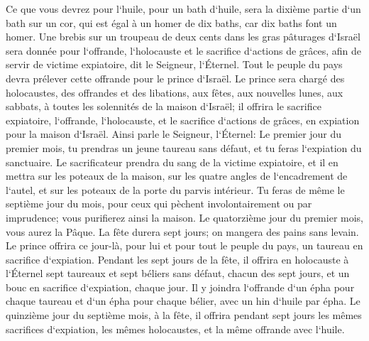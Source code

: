 \verse Ce que vous devrez pour l`huile, pour un bath d`huile, sera la dixième partie d`un bath sur un cor, qui est égal à un homer de dix baths, car dix baths font un homer. 
\verse Une brebis sur un troupeau de deux cents dans les gras pâturages d`Israël sera donnée pour l`offrande, l`holocauste et le sacrifice d`actions de grâces, afin de servir de victime expiatoire, dit le Seigneur, l`Éternel. 
\verse Tout le peuple du pays devra prélever cette offrande pour le prince d`Israël. 
\verse Le prince sera chargé des holocaustes, des offrandes et des libations, aux fêtes, aux nouvelles lunes, aux sabbats, à toutes les solennités de la maison d`Israël; il offrira le sacrifice expiatoire, l`offrande, l`holocauste, et le sacrifice d`actions de grâces, en expiation pour la maison d`Israël. 
\verse Ainsi parle le Seigneur, l`Éternel: Le premier jour du premier mois, tu prendras un jeune taureau sans défaut, et tu feras l`expiation du sanctuaire. 
\verse Le sacrificateur prendra du sang de la victime expiatoire, et il en mettra sur les poteaux de la maison, sur les quatre angles de l`encadrement de l`autel, et sur les poteaux de la porte du parvis intérieur. 
\verse Tu feras de même le septième jour du mois, pour ceux qui pèchent involontairement ou par imprudence; vous purifierez ainsi la maison. 
\verse Le quatorzième jour du premier mois, vous aurez la Pâque. La fête durera sept jours; on mangera des pains sans levain. 
\verse Le prince offrira ce jour-là, pour lui et pour tout le peuple du pays, un taureau en sacrifice d`expiation. 
\verse Pendant les sept jours de la fête, il offrira en holocauste à l`Éternel sept taureaux et sept béliers sans défaut, chacun des sept jours, et un bouc en sacrifice d`expiation, chaque jour. 
\verse Il y joindra l`offrande d`un épha pour chaque taureau et d`un épha pour chaque bélier, avec un hin d`huile par épha. 
\verse Le quinzième jour du septième mois, à la fête, il offrira pendant sept jours les mêmes sacrifices d`expiation, les mêmes holocaustes, et la même offrande avec l`huile. 

\chapter{}

